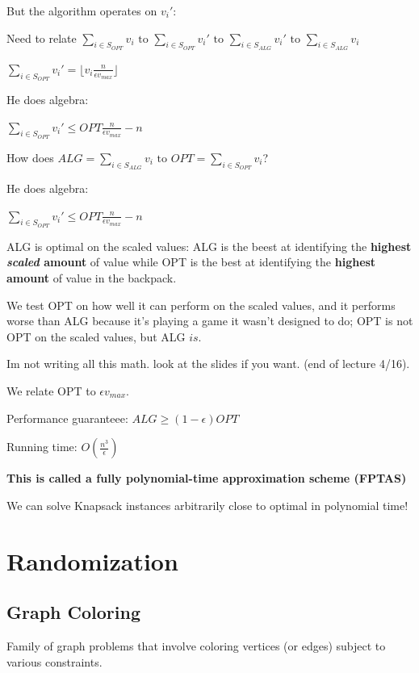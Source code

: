 \documentclass[11pt]{article}
\begin{document}
But the algorithm operates on \(v_i'\):

Need to relate \(\sum_{i \in S_{OPT}} v_i \text{ to } \sum_{i \in S_{OPT}} v_i' \text{ to } \sum_{i \in S_{ALG}} v_i' \text{ to } \sum_{i \in S_{ALG}} v_i\)


\(\sum_{i \in S_{OPT}} v_i' = \lfloor v_i \frac{n}{\epsilon v_{max}} \rfloor\)

He does algebra:

\(\sum_{i \in S_{OPT}} v_i' \leq OPT \frac{n}{\epsilon v_{max}}-n\)

How does \(ALG = \sum_{i \in S_{ALG}} v_i \text{ to } OPT = \sum_{i \in S_{OPT}} v_i\)?

He does algebra:


\(\sum_{i \in S_{OPT}} v_i' \leq OPT \frac{n}{\epsilon v_{max}}-n\)

ALG is optimal on the scaled values: ALG is the beest at identifying the \textbf{\textbf{highest \emph{scaled} amount}} of value while OPT is the best at identifying the \textbf{\textbf{highest amount}} of value in the backpack.

We test OPT on how well it can perform on the scaled values, and it performs worse than ALG because it's playing a game it wasn't designed to do; OPT is not OPT on the scaled values, but ALG \(is\).

Im not writing all this math. look at the slides if you want. (end of lecture 4/16).

We relate OPT to \(\epsilon v_{max}\).


Performance guaranteee: \(ALG \geq (1- \epsilon) OPT\)

Running time: \(O \left( \frac{n^3}{\epsilon} \right)\)

\textbf{\textbf{This is called a fully polynomial-time approximation scheme (FPTAS)}}

We can solve Knapsack instances arbitrarily close to optimal in polynomial time!


\section{Randomization}
\label{sec:orgfe7e653}


\subsection{Graph Coloring}
\label{sec:orgb979f17}

Family of graph problems that involve coloring vertices (or edges) subject to various constraints.
\end{document}
